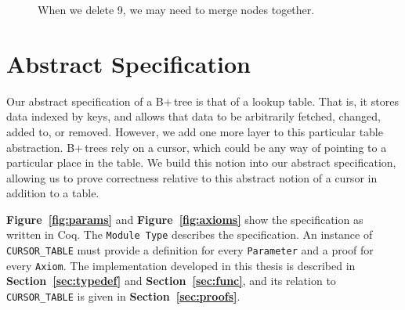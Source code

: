 \documentclass[12pt]{article}
\begin{document}
\begin{figure}[ht]
    \centering
    \caption{When we delete 9, we may need to merge nodes together.}
    \label{fig:demotree4}
\end{figure}

\clearpage

\section{Abstract Specification} \label{sec:spec}

Our abstract specification of a B+\,tree is that of a lookup table. That is, it stores data indexed by keys, and allows that data to be arbitrarily fetched, changed, added to, or removed. However, we add one more layer to this particular table abstraction. B+\,trees rely on a cursor, which could be any way of pointing to a particular place in the table. We build this notion into our abstract specification, allowing us to prove correctness relative to this abstract notion of a cursor in addition to a table.

\textbf{Figure~\ref{fig:params}} and \textbf{Figure~\ref{fig:axioms}} show the specification as written in Coq. The \texttt{Module Type} describes the specification. An instance of \texttt{CURSOR\_TABLE} must provide a definition for every \texttt{Parameter} and a proof for every \texttt{Axiom}. The implementation developed in this thesis is described in \textbf{Section~\ref{sec:typedef}} and \textbf{Section~\ref{sec:func}}, and its relation to \texttt{CURSOR\_TABLE} is given in \textbf{Section~\ref{sec:proofs}}.
\end{document}

